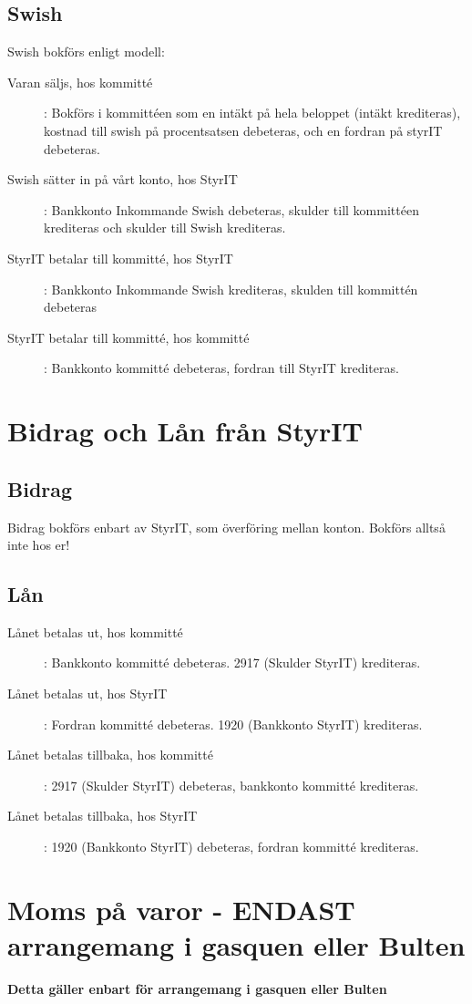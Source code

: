 \documentclass{article}
\begin{document}
\subsection{Swish}
Swish bokförs enligt modell: 
\begin{description}
    \item [Varan säljs, hos kommitté]: Bokförs i kommittéen som en intäkt på hela beloppet (intäkt krediteras), kostnad till swish på procentsatsen debeteras, och en fordran på styrIT debeteras. 
    \item [Swish sätter in på vårt konto, hos StyrIT]: Bankkonto Inkommande Swish debeteras, skulder till kommittéen krediteras och skulder till Swish krediteras. 
    \item [StyrIT betalar till kommitté, hos StyrIT]: Bankkonto Inkommande Swish krediteras, skulden till kommittén debeteras
    \item [StyrIT betalar till kommitté, hos kommitté]: Bankkonto kommitté debeteras, fordran till StyrIT krediteras.
\end{description}

\section{Bidrag och Lån från StyrIT}
\subsection{Bidrag}
Bidrag bokförs enbart av StyrIT, som överföring mellan konton. Bokförs alltså inte hos er! 
\subsection{Lån}
\begin{description}
    \item [Lånet betalas ut, hos kommitté]: Bankkonto kommitté debeteras. 2917 (Skulder StyrIT) krediteras. 
    \item [Lånet betalas ut, hos StyrIT]: Fordran kommitté debeteras. 1920 (Bankkonto StyrIT) krediteras.
    \item [Lånet betalas tillbaka, hos kommitté]: 2917 (Skulder StyrIT) debeteras, bankkonto kommitté krediteras.
    \item [Lånet betalas tillbaka, hos StyrIT]: 1920 (Bankkonto StyrIT) debeteras, fordran kommitté krediteras.
\end{description}

\section{Moms på varor - ENDAST arrangemang i gasquen eller Bulten}
\textbf{Detta gäller enbart för arrangemang i gasquen eller Bulten}
\end{document}
